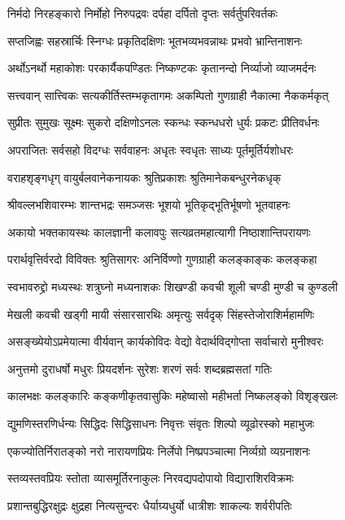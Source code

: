 \twolineshloka
{निर्मदो निरहङ्कारो निर्मोहो निरुपद्रवः}
{दर्पहा दर्पितो दृप्तः सर्वर्तुपरिवर्तकः}

\twolineshloka
{सप्तजिह्वः सहस्रार्चिः स्निग्धः प्रकृतिदक्षिणः}
{भूतभव्यभवन्नाथः प्रभवो भ्रान्तिनाशनः}

\twolineshloka
{अर्थोऽनर्थो महाकोशः परकार्यैकपण्डितः}
{निष्कण्टकः कृतानन्दो निर्व्याजो व्याजमर्दनः}

\twolineshloka
{सत्त्ववान् सात्त्विकः सत्यकीर्तिस्तम्भकृतागमः}
{अकम्पितो गुणग्राही नैकात्मा नैककर्मकृत्}

\twolineshloka
{सुप्रीतः सुमुखः सूक्ष्मः सुकरो दक्षिणोऽनलः}
{स्कन्धः स्कन्धधरो धुर्यः प्रकटः प्रीतिवर्धनः}

\twolineshloka
{अपराजितः सर्वसहो विदग्धः सर्ववाहनः}
{अधृतः स्वधृतः साध्यः पूर्तमूर्तिर्यशोधरः}

\twolineshloka
{वराहशृङ्गधृग् वायुर्बलवानेकनायकः}
{श्रुतिप्रकाशः श्रुतिमानेकबन्धुरनेकधृक्}

\twolineshloka
{श्रीवल्लभशिवारम्भः शान्तभद्रः समञ्जसः}
{भूशयो भूतिकृद्भूतिर्भूषणो भूतवाहनः}

\twolineshloka
{अकायो भक्तकायस्थः कालज्ञानी कलावपुः}
{सत्यव्रतमहात्यागी निष्ठाशान्तिपरायणः}

\twolineshloka
{परार्थवृत्तिर्वरदो विविक्तः श्रुतिसागरः}
{अनिर्विण्णो गुणग्राही कलङ्काङ्कः कलङ्कहा}

\twolineshloka
{स्वभावरुद्द्रो मध्यस्थः शत्रुघ्नो मध्यनाशकः}
{शिखण्डी कवची शूली चण्डी मुण्डी च कुण्डली}

\twolineshloka
{मेखली कवची खड्गी मायी संसारसारथिः}
{अमृत्युः सर्वदृक् सिंहस्तेजोराशिर्महामणिः}

\twolineshloka
{असङ्ख्येयोऽप्रमेयात्मा वीर्यवान् कार्यकोविदः}
{वेद्यो वेदार्थविद्गोप्ता सर्वाचारो मुनीश्वरः}

\twolineshloka
{अनुत्तमो दुराधर्षो मधुरः प्रियदर्शनः}
{सुरेशः शरणं सर्वः शब्दब्रह्मसतां गतिः}

\twolineshloka
{कालभक्षः कलङ्कारिः कङ्कणीकृतवासुकिः}
{महेष्वासो महीभर्ता निष्कलङ्को विशृङ्खलः}

\twolineshloka
{द्युमणिस्तरणिर्धन्यः सिद्धिदः सिद्धिसाधनः}
{निवृत्तः संवृतः शिल्पो व्यूढोरस्को महाभुजः}

\twolineshloka
{एकज्योतिर्निरातङ्को नरो नारायणप्रियः}
{निर्लेपो निष्प्रपञ्चात्मा निर्व्यग्रो व्यग्रनाशनः}

\twolineshloka
{स्तव्यस्तवप्रियः स्तोता व्यासमूर्तिरनाकुलः}
{निरवद्यपदोपायो विद्याराशिरविक्रमः}

\twolineshloka
{प्रशान्तबुद्धिरक्षुद्रः क्षुद्रहा नित्यसुन्दरः}
{धैर्याग्र्यधुर्यो धात्रीशः शाकल्यः शर्वरीपतिः}

